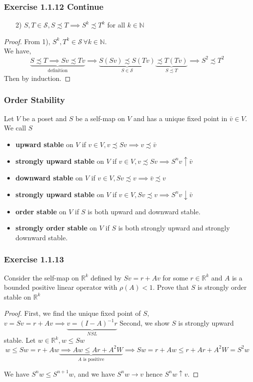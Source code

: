 \documentclass[11pt,xcolor={dvipsnames},hyperref={pdftex,pdfpagemode=UseNone,hidelinks,pdfdisplaydoctitle=true},usepdftitle=false]{beamer}
\begin{document}
\begin{frame}
\frametitle{Exercise 1.1.12 Continue}
\begin{enumerate}
\item[2)] $S,T\in\mathcal{S}, S\precsim T\implies S^k\precsim T^k$ for all $k\in\mathbb{N}$
\end{enumerate}
\begin{proof}
From 1), $S^k,T^k\in\mathcal{S}\,\forall k\in\mathbb{N}$.\\
We have,
$$
\underbrace{S\precsim T\implies Sv\precsim Tv}_{\text{definition}}\implies\underbrace{S(Sv)\precsim S(Tv)}_{S\in \mathcal{S}}\underbrace{\precsim T(Tv)}_{S\precsim T} \implies S^2\precsim T^2
$$
Then by induction.
\end{proof}
\end{frame}

\begin{frame}
\frametitle{Order Stability}
\begin{definition}
Let $V$ be a poset and $S$ be a self-map on $V$ and has a unique fixed point in $\bar v\in V$. We call $S$
\begin{itemize}
\item \textbf{upward stable} on $V$ if $v\in V, v\precsim Sv\implies v\precsim \bar v$

\item \textbf{strongly upward stable} on $V$ if $v\in V, v\precsim Sv\implies S^n v\uparrow \bar v$

\item \textbf{downward stable} on $V$ if $v\in V, Sv\precsim v\implies \bar v\precsim  v$

\item \textbf{strongly upward stable} on $V$ if $v\in V, Sv\precsim v\implies S^n v\downarrow \bar v$

\item \textbf{order stable} on $V$ if $S$ is both upward and downward stable.

\item \textbf{strongly order stable} on $V$ if $S$ is both strongly upward and strongly downward stable.
\end{itemize}
\end{definition}
\end{frame}

\begin{frame}
\frametitle{Exercise 1.1.13}
Consider the self-map on $\mathbb{R}^k$ defined by $Sv = r+Av$ for some $r\in\mathbb{R}^k$ and $A$ is a bounded positive linear operator with $\rho(A)<1$.  Prove that $S$ is strongly order stable on $\mathbb{R}^k$

\begin{proof}
First, we find the unique fixed point of $S$, $ v = Sv = r+Av \implies \underbrace{v = (I-A)^{-1}r}_{NSL}$
Second, we show $S$ is strongly upward stable. Let $w\in \mathbb{R}^k, w\le Sw$
$$
w\le Sw = r+Aw \underbrace{\implies Aw\le A r+A^2W}_{A \text{ is positive}} \implies Sw= r+Aw \le r+Ar+A^2 W = S^2w
$$

We have $S^n w\le S^{n+1}w$, and we have $S^n w \to v$ hence $S^n w\uparrow v$.
\end{proof}

\end{frame}
\end{document}
